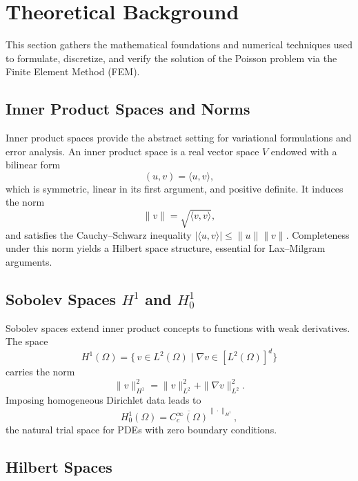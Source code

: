\section{Theoretical Background}

This section gathers the mathematical foundations and numerical techniques used to formulate, discretize, and verify the solution of the Poisson problem via the Finite Element Method (FEM).

\subsection{Inner Product Spaces and Norms}

Inner product spaces provide the abstract setting for variational formulations and error analysis.  An inner product space is a real vector space $V$ endowed with a bilinear form
\begin{equation}
  (u,v) = \langle u,v\rangle,
\end{equation}
which is symmetric, linear in its first argument, and positive definite.  It induces the norm
\begin{equation}
  \|v\| = \sqrt{\langle v,v\rangle},
\end{equation}
and satisfies the Cauchy–Schwarz inequality $|\langle u,v\rangle|\le\|u\|\|v\|$.  Completeness under this norm yields a Hilbert space structure, essential for Lax–Milgram arguments. \citep{Rudin1973,Brezis2011}

\subsection{Sobolev Spaces $H^1$ and $H_0^1$}

Sobolev spaces extend inner product concepts to functions with weak derivatives.  The space
\begin{equation}
  H^1(\Omega)
  = \{\,v\in L^2(\Omega)\mid \nabla v\in [L^2(\Omega)]^d\}
\end{equation}
carries the norm
\begin{equation}
  \|v\|_{H^1}^2 = \|v\|_{L^2}^2 + \|\nabla v\|_{L^2}^2.
\end{equation}
Imposing homogeneous Dirichlet data leads to
\begin{equation}
  H_0^1(\Omega)
  = \overline{C_c^\infty(\Omega)}^{\|\cdot\|_{H^1}},
\end{equation}
the natural trial space for PDEs with zero boundary conditions. \citep{Adams1975,Brezis2011}

\subsection{Hilbert Spaces}

